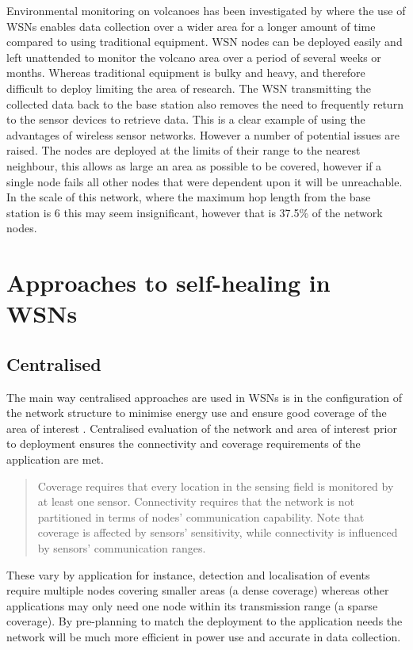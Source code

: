 \documentclass[authoryearcitations]{UoYCSproject}
\begin{document}
Environmental monitoring on volcanoes has been investigated by \citet{Werner-Allen2006} where the use of WSNs enables data collection over a wider area for a longer amount of time compared to using traditional equipment. WSN nodes can be deployed easily and left unattended to monitor the volcano area over a period of several weeks or months. Whereas traditional equipment is bulky and heavy, and therefore difficult to deploy limiting the area of research. The WSN transmitting the collected data back to the base station also removes the need to frequently return to the sensor devices to retrieve data. This is a clear example of using the advantages of wireless sensor networks. However a number of potential issues are raised. The nodes are deployed at the limits of their range to the nearest neighbour, this allows as large an area as possible to be covered, however if a single node fails all other nodes that were dependent upon it will be unreachable. In the scale of this network, where the maximum hop length from the base station is 6 this may seem insignificant, however that is 37.5\% of the network nodes.


\section{Approaches to self-healing in WSNs}



\subsection{Centralised}

The main way centralised approaches are used in WSNs is in the configuration of the network structure to minimise energy use and ensure good coverage of the area of interest \citep{Wang2003,Ding2005,Wang2005,Derr2013}. Centralised evaluation of the network and area of interest prior to deployment ensures the connectivity and coverage requirements of the application are met.
\begin{quote}
Coverage requires that every location in the sensing field is monitored by at least one sensor. Connectivity requires that the network is not partitioned in terms of nodes' communication capability. Note that coverage is affected by sensors' sensitivity, while connectivity is influenced by sensors' communication ranges.
\citep{Wang2005}
\end{quote}
These vary by application for instance, detection and localisation of events require multiple nodes covering smaller areas (a dense coverage) whereas other applications may only need one node within its transmission range (a sparse coverage). By pre-planning to match the deployment to the application needs the network will be much more efficient in power use and accurate in data collection.
\end{document}
